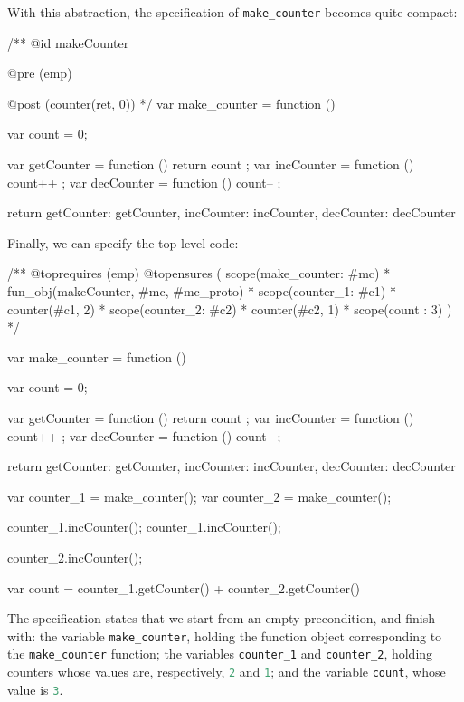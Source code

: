 \documentclass{llncs}
\def\jsinline{\lstinline[language=JavaScript, basicstyle=\small]}
\begin{document}
\medskip
With this abstraction, the specification of \jsinline|make_counter| becomes quite compact:

\medskip
\begin{lstjs}[firstnumber=1]
/**
  @id makeCounter

  @pre (emp)
  
  @post (counter(ret, 0))
*/
var make_counter = function () {
   var count = 0;

   var getCounter = function () { return count };
   var incCounter = function () { count++ };
   var decCounter = function () { count-- };

   return { getCounter: getCounter, incCounter: incCounter, decCounter: decCounter }
}
\end{lstjs}

\medskip
Finally, we can specify the top-level code:
\begin{lstjs}[firstnumber=1]
/**
 @toprequires (emp)
 @topensures (
   scope(make_counter: #mc) *
   fun_obj(makeCounter, #mc, #mc_proto) *
   scope(counter_1: #c1) * counter(#c1, 2) *
   scope(counter_2: #c2) * counter(#c2, 1) *
   scope(count : 3)
 )
*/

var make_counter = function () {
   var count = 0;

   var getCounter = function () { return count };
   var incCounter = function () { count++ };
   var decCounter = function () { count-- };

   return { getCounter: getCounter, incCounter: incCounter, decCounter: decCounter }
}

var counter_1 = make_counter();
var counter_2 = make_counter();

counter_1.incCounter();
counter_1.incCounter();

counter_2.incCounter();

var count = counter_1.getCounter() + counter_2.getCounter()
\end{lstjs}

The specification states that we start from an empty precondition, and finish with: the variable \jsinline|make_counter|, holding the function object corresponding to the \jsinline|make_counter| function; the variables \jsinline|counter_1| and \jsinline|counter_2|, holding counters whose values are, respectively, \jsinline|2| and \jsinline|1|; and the variable \jsinline|count|, whose value is \jsinline|3|.
\end{document}
